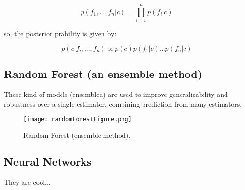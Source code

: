 \begin{center}
\begin{equation}
\label{NBC}
p(f_1,...,f_n|c) = \prod_{i=1}^{n}p(f_i|c)
\end{equation}
\end{center}

so, the posterior prability is given by:

\begin{center}
\begin{equation}
\label{pNBC}
p(c|f_i,...,f_n) \propto p(c)p(f_1|c)...p(f_n|c)
\end{equation}
\end{center}

\subsection{Random Forest (an ensemble method)}
These kind of models (ensembled) are used to improve generalizability and robustness over a single estimator, combining prediction from many estimators. 


\begin{figure}[h]
	\label{fig:randomForest}
	\texttt{[image: randomForestFigure.png]}
    \caption{Random Forest (ensemble method).}
\end{figure}

\subsection{Neural Networks}
They are cool...

